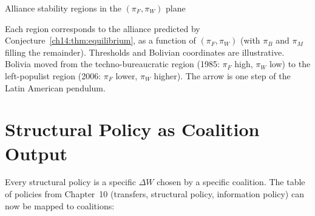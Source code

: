 \documentclass[../structural_economics_book.tex]{subfiles}
\begin{document}
\begin{vizpanel}{Alliance stability regions in the $(\pi_F, \pi_W)$ plane}
\begin{center}
\end{center}
\vspace{-0.5em}
\small Each region corresponds to the alliance predicted by Conjecture~\ref{ch14:thm:equilibrium}, as a function of $(\pi_F, \pi_W)$ (with $\pi_B$ and $\pi_M$ filling the remainder). Thresholds and Bolivian coordinates are illustrative. Bolivia moved from the techno-bureaucratic region (1985: $\pi_F$ high, $\pi_W$ low) to the left-populist region (2006: $\pi_F$ lower, $\pi_W$ higher). The arrow is one step of the Latin American pendulum.
\end{vizpanel}


\section{Structural Policy as Coalition Output}
\label{ch14:sec:policy}

Every structural policy is a specific $\Delta W$ chosen by a specific coalition. The table of policies from Chapter~10 (transfers, structural policy, information policy) can now be mapped to coalitions:
\end{document}

